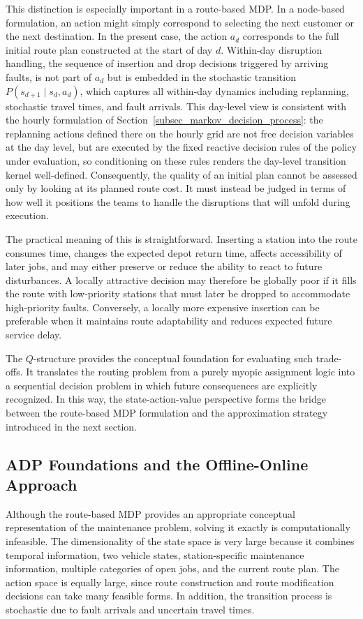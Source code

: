 \documentclass[12pt,oneside]{article}
\begin{document}
This distinction is especially important in a route-based MDP. In a node-based formulation, an action might simply correspond to selecting the next customer or the next destination. In the present case, the action $a_d$ corresponds to the full initial route plan constructed at the start of day $d$. Within-day disruption handling, the sequence of insertion and drop decisions triggered by arriving faults, is not part of $a_d$ but is embedded in the stochastic transition $P(s_{d+1} \mid s_d, a_d)$, which captures all within-day dynamics including replanning, stochastic travel times, and fault arrivals. This day-level view is consistent with the hourly formulation of Section~\ref{subsec_markov_decision_process}: the replanning actions defined there on the hourly grid are not free decision variables at the day level, but are executed by the fixed reactive decision rules of the policy under evaluation, so conditioning on these rules renders the day-level transition kernel well-defined. Consequently, the quality of an initial plan cannot be assessed only by looking at its planned route cost. It must instead be judged in terms of how well it positions the teams to handle the disruptions that will unfold during execution.

The practical meaning of this is straightforward. Inserting a station into the route consumes time, changes the expected depot return time, affects accessibility of later jobs, and may either preserve or reduce the ability to react to future disturbances. A locally attractive decision may therefore be globally poor if it fills the route with low-priority stations that must later be dropped to accommodate high-priority faults. Conversely, a locally more expensive insertion can be preferable when it maintains route adaptability and reduces expected future service delay.

The $Q$-structure provides the conceptual foundation for evaluating such trade-offs. It translates the routing problem from a purely myopic assignment logic into a sequential decision problem in which future consequences are explicitly recognized. In this way, the state-action-value perspective forms the bridge between the route-based MDP formulation and the approximation strategy introduced in the next section.


\subsection{ADP Foundations and the Offline-Online Approach}\label{subsec_adp_foundations_and_the_offlineonline_approach}
Although the route-based MDP provides an appropriate conceptual representation of the maintenance problem, solving it exactly is computationally infeasible. The dimensionality of the state space is very large because it combines temporal information, two vehicle states, station-specific maintenance information, multiple categories of open jobs, and the current route plan. The action space is equally large, since route construction and route modification decisions can take many feasible forms. In addition, the transition process is stochastic due to fault arrivals and uncertain travel times.
\end{document}
